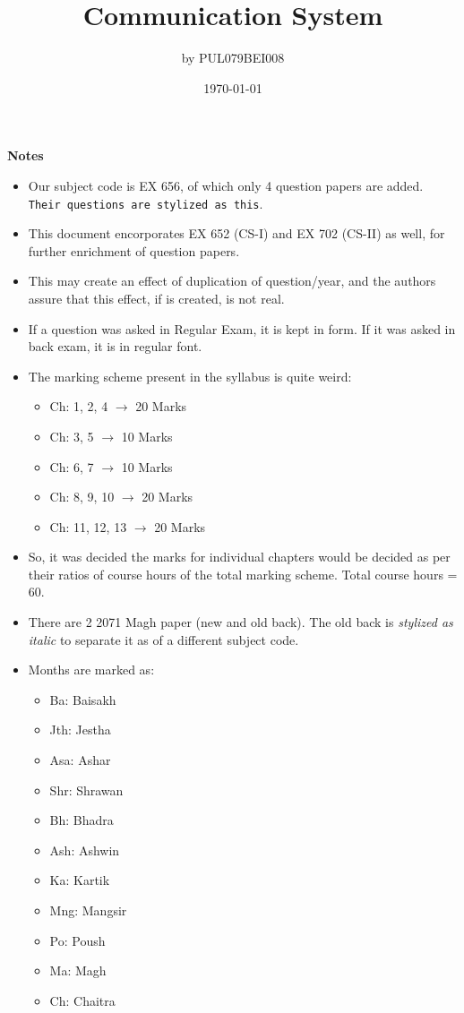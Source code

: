 \documentclass[12pt]{article}
\title{Communication System}
\author{by PUL079BEI008}
\date{\today}
\begin{document}
\maketitle
\vspace{3cm}
\textbf{Notes}
\begin{itemize}[noitemsep]
	\item Our subject code is EX 656, of which only 4 question papers are added. \texttt{Their questions are stylized as this}.
	\item This document encorporates EX 652 (CS-I) and EX 702 (CS-II) as well, for further enrichment of question papers.
	\item This may create an effect of duplication of question/year, and the authors assure that this effect, if is created, is not real.
	\item If a question was asked in Regular Exam, it is kept in  form. If it was asked in back exam, it is in regular font.
  \item The marking scheme present in the syllabus is quite weird:
  \begin{itemize}[noitemsep, topsep=0pt]
    \item Ch: 1, 2, 4 $\rightarrow$ 20 Marks
    \item Ch: 3, 5 $\rightarrow$ 10 Marks
    \item Ch: 6, 7 $\rightarrow$ 10 Marks
    \item Ch: 8, 9, 10 $\rightarrow$ 20 Marks
    \item Ch: 11, 12, 13 $\rightarrow$ 20 Marks
  \end{itemize}
  \item So, it was decided the marks for individual chapters would be decided as per their ratios of course hours of the total marking scheme. Total course hours = 60.
  \item There are 2 2071 Magh paper (new and old back). The old back is \textit{stylized as italic} to separate it as of a different subject code.
	\item Months are marked as: 
	\begin{itemize}[noitemsep, topsep=0pt]
		\item Ba: Baisakh
		\item Jth: Jestha
		\item Asa: Ashar
		\item Shr: Shrawan
		\item Bh: Bhadra
		\item Ash: Ashwin
		\item Ka: Kartik
		\item Mng: Mangsir
		\item Po: Poush
		\item Ma: Magh
		\item Ch: Chaitra
	\end{itemize}
\end{itemize}
\pagebreak
\tableofcontents
\pagebreak
\end{document}
